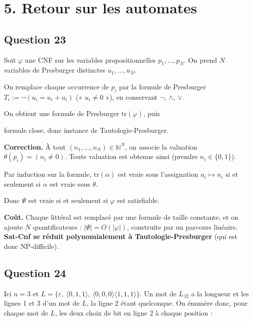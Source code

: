 \documentclass[11pt,a4paper]{article}
\newcommand{\equationajustee}[1]{%
  \sbox{\boiteequation}{$\displaystyle #1$}%
  \ifdim\wd\boiteequation>\linewidth
    \[\resizebox{\linewidth}{!}{\usebox{\boiteequation}}\]%
  \else
    \[#1\]%
  \fi}
\begin{document}
\hypertarget{retour-sur-les-automates}{%
\section{5. Retour sur les automates}\label{retour-sur-les-automates}}

\hypertarget{question-23}{%
\subsection{Question 23}\label{question-23}}

Soit \(\varphi\) une CNF sur les variables propositionnelles \(p_1,\dots,p_N\). On prend \(N\) variables de Presburger distinctes \(u_1,\dots,u_N\).

On remplace chaque occurrence de \(p_i\) par la formule de Presburger \(T_i:=\neg(u_i=u_i+u_i)\) (« \(u_i\ne0\) »), en conservant \(\neg\), \(\wedge\), \(\vee\).

On obtient une formule de Presburger \(\mathrm{tr}(\varphi)\), puis

\equationajustee{\boxed{\Psi:=\exists u_1.\exists u_2\cdots\exists u_N.\ \mathrm{tr}(\varphi)}}

formule close, donc instance de Tautologie-Presburger.

\textbf{Correction.} À tout \((n_1,\dots,n_N)\in{\mathbb{N}}^N\), on associe la valuation \(\theta(p_i)=(n_i\ne0)\). Toute valuation est obtenue ainsi (prendre \(n_i\in\{0,1\}\)).

Par induction sur la formule, \(\mathrm{tr}(\alpha)\) est vraie sous l'assignation \(u_i\mapsto n_i\) si et seulement si \(\alpha\) est vraie sous \(\theta\).

Donc \(\Psi\) est vraie si et seulement si \(\varphi\) est satisfiable.

\textbf{Coût.} Chaque littéral est remplacé par une formule de taille constante, et on ajoute \(N\) quantificateurs : \(|\Psi|=O(|\varphi|)\), construite par un parcours linéaire. \textbf{Sat-Cnf se réduit polynomialement à Tautologie-Presburger} (qui est donc NP-difficile).

\hypertarget{question-24}{%
\subsection{Question 24}\label{question-24}}

Ici \(n=3\) et \(L=\{\varepsilon,\allowbreak \ \langle0,\allowbreak 1,\allowbreak 1\rangle,\allowbreak \ \langle0,\allowbreak 0,\allowbreak 0\rangle\langle1,\allowbreak 1,\allowbreak 1\rangle\}\). Un mot de \(L_{\exists2}\) a la longueur et les lignes 1 et 3 d'un mot de \(L\), la ligne 2 étant quelconque. On énumère donc, pour chaque mot de \(L\), les deux choix de bit en ligne 2 à chaque position :
\end{document}
